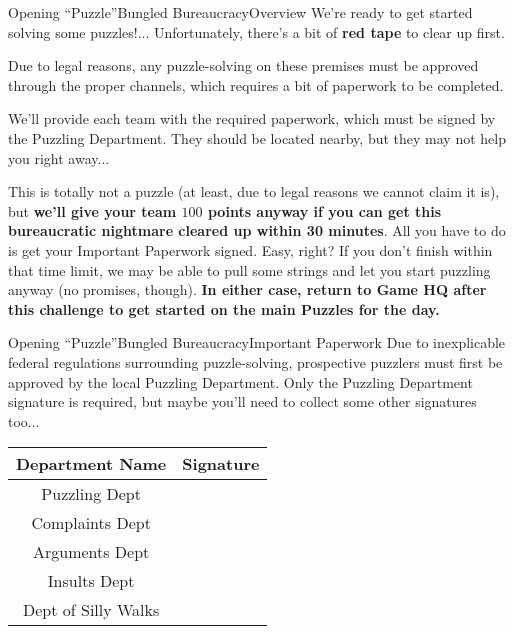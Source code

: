 
\begin{customPuzzle}{Opening ``Puzzle''}{Bungled Bureaucracy}{Overview}
  We're ready to get started solving some puzzles!... Unfortunately,
  there's a bit of \textbf{red tape} to clear up first.

  Due to legal reasons, any puzzle-solving on these premises
  must be approved through the proper channels,
  which requires a bit of paperwork to be completed.

  We'll provide each team with the required paperwork, which must
  be signed by the Puzzling Department. They should be located nearby,
  but they may not help you right away...

  This is totally not a puzzle (at least, due to legal reasons we
  cannot claim it is), but \textbf{we'll give your team
  \(100\) points anyway if you can get
  this bureaucratic nightmare cleared up within 30 minutes}.
  All you have to do is get your Important Paperwork signed.
  Easy, right?
  If you don't finish within that time limit, we may be able to pull
  some strings and let you start puzzling anyway (no promises, though).
  \textbf{
  In either case, return to Game HQ after this challenge to get started
  on the main Puzzles for the day.}
\end{customPuzzle}

\begin{customPuzzle}{Opening ``Puzzle''}{Bungled Bureaucracy}{Important Paperwork}
  Due to inexplicable
  federal regulations surrounding puzzle-solving, prospective puzzlers must
  first be approved by the local Puzzling Department. Only the Puzzling
  Department signature is required, but maybe you'll need to collect
  some other signatures too...

  {\Large
  \begin{tabular}{c|c}
    Department Name & Signature \hspace{15em} \\\hline\hline
    Puzzling Dept & \\\hline
    Complaints Dept & \\\hline
    Arguments Dept & \\\hline
    Insults Dept & \\\hline
    Dept of Silly Walks & \\\hline
  \end{tabular}
  }
\end{customPuzzle}

